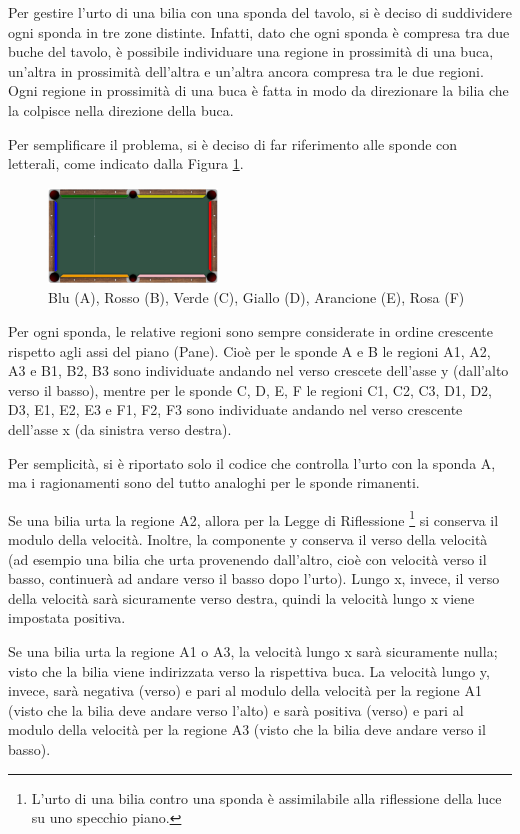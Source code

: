 \documentclass[12pt,a4paper]{report}
\begin{document}
\pagebreak

Per gestire l'urto di una bilia con una sponda del tavolo, si è deciso di suddividere ogni sponda in tre zone distinte.
Infatti, dato che ogni sponda è compresa tra due buche del tavolo, è possibile individuare una regione in prossimità di una buca, un'altra in prossimità dell'altra e un'altra ancora compresa tra le due regioni.
Ogni regione in prossimità di una buca è fatta in modo da direzionare la bilia che la colpisce nella direzione della buca.

Per semplificare il problema, si è deciso di far riferimento alle sponde con letterali, come indicato dalla Figura \ref{fig:Banks}.

\begin{figure}[h]
    \centering
    \includegraphics[width=0.4\textwidth]{Banks.png}
    \caption{Blu (A), Rosso (B), Verde (C), Giallo (D), Arancione (E), Rosa (F)}
    \label{fig:Banks}
\end{figure}

Per ogni sponda, le relative regioni sono sempre considerate in ordine crescente rispetto agli assi del piano (Pane). Cioè per le sponde A e B le regioni A1, A2, A3 e B1, B2, B3 sono individuate andando nel verso crescete dell'asse y (dall'alto verso il basso), mentre per le sponde C, D, E, F le regioni C1, C2, C3, D1, D2, D3, E1, E2, E3 e F1, F2, F3 sono individuate andando nel verso crescente dell'asse x (da sinistra verso destra).

\vspace{3mm}

Per semplicità, si è riportato solo il codice che controlla l'urto con la sponda A, ma i ragionamenti sono del tutto analoghi per le sponde rimanenti.

Se una bilia urta la regione A2, allora per la Legge di Riflessione \footnote{L'urto di una bilia contro una sponda è assimilabile alla riflessione della luce su uno specchio piano.} si conserva il modulo della velocità.
Inoltre, la componente y conserva il verso della velocità (ad esempio una bilia che urta provenendo dall'altro, cioè con velocità verso il basso, continuerà ad andare verso il basso dopo l'urto).
Lungo x, invece, il verso della velocità sarà sicuramente verso destra, quindi la velocità lungo x viene impostata positiva.

Se una bilia urta la regione A1 o A3, la velocità lungo x sarà sicuramente nulla; visto che la bilia viene indirizzata verso la rispettiva buca.
La velocità lungo y, invece, sarà negativa (verso) e pari al modulo della velocità per la regione A1 (visto che la bilia deve andare verso l'alto) e sarà positiva (verso) e pari al modulo della velocità per la regione A3 (visto che la bilia deve andare verso il basso).

\pagebreak


\end{document}
